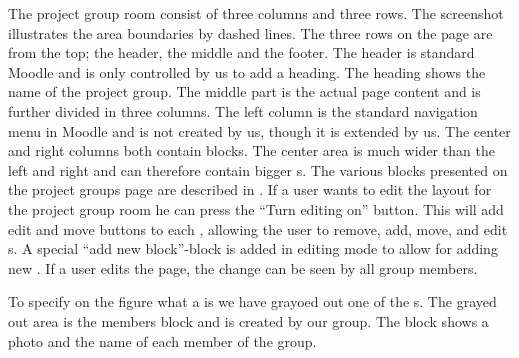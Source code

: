 The project group room consist of three columns and three rows. 
The screenshot illustrates the area boundaries by dashed lines. 
The three rows on the page are from the top; the header, the middle and the footer. 
The header is standard Moodle and is only controlled by us to add a heading. 
The heading shows the name of the project group. 
The middle part is the actual page content and is further divided in three columns. 
The left column is the standard navigation menu in Moodle and is not created by us, though it is extended by us.
The center and right columns both contain blocks.
The center area is much wider than the left and right and can therefore contain bigger \block{}s. 
The various blocks presented on the project groups page are described in . 
If a user wants to edit the layout for the project group room he can press the ``Turn editing on'' button. 
This will add edit and move buttons to each \block{}, allowing the user to remove, add, move, and edit \block{}s. 
A special ``add new block''-block is added in editing mode to allow for adding new \block[]. 
If a user edits the page, the change can be seen by all group members. 

To specify on the figure what a \block{} is we have grayoed out one of the \block{}s.
The grayed out area is the members block and is created by our group. 
The block shows a photo and the name of each member of the group. 



